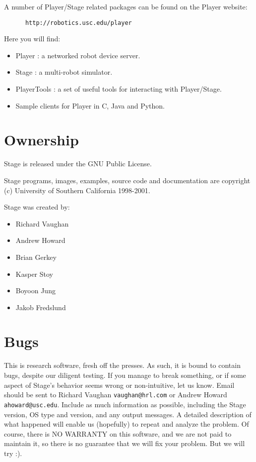 \documentclass[11pt]{report}
\begin{document}
    A number of Player/Stage related packages can be found on the 
    Player website:
      \begin{verbatim}
      http://robotics.usc.edu/player
      \end{verbatim}
    Here you will find:
      \begin{itemize}
      \item Player : a networked robot device server.
      \item Stage : a multi-robot simulator.
      \item PlayerTools : a set of useful tools for interacting with
            Player/Stage.
      \item Sample clients for Player in C, Java and Python.
      \end{itemize}

  \section{Ownership}

    \noindent Stage is released under the GNU Public License.

    \noindent Stage programs, images, examples, source code and documentation are
    copyright (c) University of Southern California 1998-2001.

    \noindent Stage was created by:
      \begin{itemize}
      \item[] Richard Vaughan
      \item[] Andrew Howard
      \item[] Brian Gerkey
      \item[] Kasper Stoy
      \item[] Boyoon Jung
      \item[] Jakob Fredslund
      \end{itemize}

  \section{Bugs}
  
    This is research software, fresh off the presses.  As such, it is
    bound to contain bugs, despite our diligent testing.  If you
    manage to break something, or if some aspect of Stage's behavior
    seems wrong or non-intuitive, let us know.  Email should be sent
    to Richard Vaughan {\tt vaughan@hrl.com} or Andrew Howard {\tt
    ahoward@usc.edu}.  Include as much information as possible,
    including the Stage version, OS type and version, and any output
    messages.  A detailed description of what happened will enable us
    (hopefully) to repeat and analyze the problem.  Of course, there
    is NO WARRANTY on this software, and we are not paid to maintain
    it, so there is no guarantee that we will fix your problem.  But
    we will try :).
\end{document}
